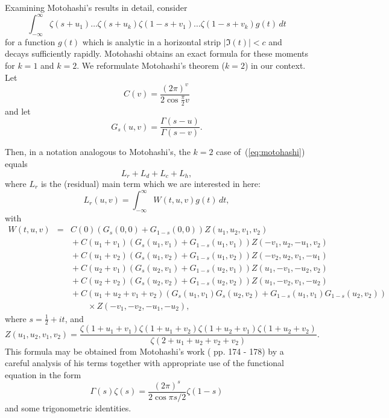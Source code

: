 \documentclass[12pt,letterpaper]{amsart}
\theoremstyle{plain}
\theoremstyle{definition}
\theoremstyle{remark}
\numberwithin{equation}{subsection}
\numberwithin{theorem}{subsection}
\numberwithin{table}{subsection}
\begin{document}
Examining Motohashi's results in detail, 
consider
       \begin{equation}
           \label{eq:motohashi}
           \int_{-\infty}^\infty  \zeta(s+u_1) \dots
           \zeta(s+u_k)\zeta(1-s+v_1)\dots \zeta(1-s+v_k) g(t)\,dt
       \end{equation}
for a function $g(t)$ which is analytic in a horizontal strip $|\Im(t)|<c$
and decays sufficiently rapidly. Motohashi obtains an exact formula for
these moments for $k=1$ and $k=2$.
We reformulate Motohashi's theorem ($k=2$) in our context. Let
\begin{equation} C(v)=\frac{(2\pi)^v}{2 \cos \frac \pi 2 v}
\end{equation}
and let
\begin{equation}G_s(u,v)=\frac{\Gamma(s-u)}{\Gamma(s-v)}.
\end{equation}

Then, in a notation analogous to Motohashi's, the $k=2$ case
        of~(\ref{eq:motohashi}) equals
        \begin{equation} L_r+L_d+L_c+L_h  ,
        \end{equation}
where $L_r$ is the (residual) main term which we are interested in here:
\begin{equation}L_r({u},{v})= \int_{-\infty}^\infty
W(t,{u},{v})g(t)\,dt  ,
\end{equation}
with
\begin{eqnarray}
W(t,{u},{v})& =  &C(0)(G_s(0,0)+G_{1-s}(0,0))Z(u_1,u_2,v_1,v_2)\nonumber \\&   &\mbox{} + C(u_1+v_1)(G_s(u_1,v_1)+G_{1-s}(u_1,v_1))Z(-v_1,u_2,-u_1,v_2)\nonumber \\&   &\mbox{} + C(u_1+v_2)(G_s(u_1,v_2)+G_{1-s}(u_1,v_2))Z(-v_2,u_2,v_1,-u_1)\nonumber \\&   &\mbox{} + C(u_2+v_1)(G_s(u_2,v_1)+G_{1-s}(u_2,v_1))Z(u_1,-v_1,-u_2,v_2)\nonumber \\&   &\mbox{} + C(u_2+v_2)(G_s(u_2,v_2)+G_{1-s}(u_2,v_2))Z(u_1,-v_2,v_1,-u_2)\nonumber \\&   &\mbox{} +
C(u_1+u_2+v_1+v_2)(G_s(u_1,v_1)G_s(u_2,v_2)+G_{1-s}(u_1,v_1)G_{1-s}(u_2,v_2))\nonumber \\&   &\qquad \times Z(-v_1,-v_2,-u_1,-u_2),
 \end{eqnarray}
where $s=\frac12+it$, and
\begin{equation}
Z(u_1,u_2,v_1,v_2)=\frac{\zeta(1+u_1+v_1)\zeta(1+u_1+v_2)\zeta(1+u_2+v_1)
\zeta(1+u_2+v_2)}{\zeta(2+u_1+u_2+v_2+v_2)}.
\end{equation}
This formula may be obtained from Motohashi's
work (\cite{Mot} pp. 174 - 178) by a
careful analysis of his terms together with appropriate use of the
functional equation in the form
\begin{equation}\Gamma(s) \zeta(s) =\frac{(2\pi)^s}{2\cos \pi s/2}\zeta(1-s)
\end{equation}
and some trigonometric identities.
\end{document}
